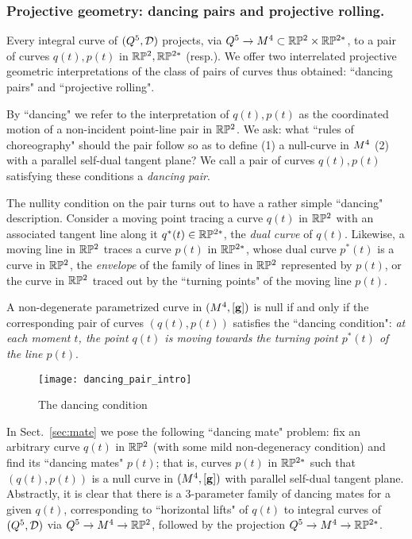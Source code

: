  \subsubsection{Projective geometry: dancing pairs and projective rolling.}\label{ProjGeom}
 
 
 Every integral curve of $(Q^5,{\mathcal D})$ projects, via $Q^5\to M^4\subset \mathbb{R}\mathbb{P}^2\times\mathbb{R}\mathbb{P}^{2*}$, to a pair of curves $q(t), p(t)$ in $\mathbb{R}\mathbb{P}^2, \mathbb{R}\mathbb{P}^{2*}$  (resp.). We offer two  interrelated projective geometric interpretations of the class of pairs of curves thus obtained:  ``dancing pairs" and ``projective rolling".   

By ``dancing" we refer to the interpretation of  $q(t), p(t)$   as the coordinated  motion of a non-incident point-line pair  in $\mathbb{R}\mathbb{P}^2$. We ask: what ``rules of choreography" should the  pair  follow so as to define (1) a null-curve in  $M^4$ (2)  with a parallel self-dual tangent plane?  We call a pair of curves $q(t), p(t)$ satisfying these conditions a {\em dancing pair}. 

 The nullity condition on the pair  turns out to have a rather simple ``dancing" description. Consider a moving point  tracing a curve $q(t)$ in $\mathbb{R}\mathbb{P}^2$  with an associated  tangent line along it $q^*(t)\in\mathbb{R}\mathbb{P}^{2*}$, the {\em dual curve} of  $q(t)$.  Likewise, a  moving line   in $ \mathbb{R}\mathbb{P}^2$ traces a curve $p(t)$ in $\mathbb{R}\mathbb{P}^{2*}$,  whose dual curve $p^*(t)$ is a curve in $\mathbb{R}\mathbb{P}^2$, the   {\em envelope} of the family of lines in $\mathbb{R}\mathbb{P}^2$ represented by  $p(t)$, or  the curve in $\mathbb{R}\mathbb{P}^2$ traced out by the ``turning points" of the moving line $p(t)$. 


\begin{theorem}\label{intro_dancing}A   non-degenerate parametrized curve  in $(M^4,[\mathbf{ g}])$ is null if and only if the corresponding pair of curves  $(q(t), p(t))$  satisfies the ``dancing condition": {\em at each moment $t$, the point $q(t)$ is moving towards the turning  point $p^*(t)$ of  the line $p(t)$}. 
\end{theorem}
%
\begin{figure}[h]\centering
\texttt{[image: dancing\_pair\_intro]}
 \caption{The  dancing condition}\label{fig:dance}
\end{figure}
In Sect.~\ref{sec:mate} we pose the following ``dancing mate" problem: fix  an arbitrary  curve $q(t)$ in $\mathbb{R}\mathbb{P}^2$ (with some mild non-degeneracy condition) and find its ``dancing mates" $p(t)$; that is, curves $p(t)$ in $\mathbb{R}\mathbb{P}^{2*}$ such that   $(q(t),p(t))$ 
is a null curve in $(M^4, [\mathbf{ g}])$ with parallel self-dual tangent plane.  Abstractly, it is clear that there is a 3-parameter family of dancing mates for a given $q(t)$, corresponding to ``horizontal lifts" of $q(t)$ to integral curves of $(Q^5, {\mathcal D})$ via $Q^5\to M^4\to \mathbb{R}\mathbb{P}^2$, followed by the projection $Q^5\to M^4\to \mathbb{R}\mathbb{P}^{2*}$. 

